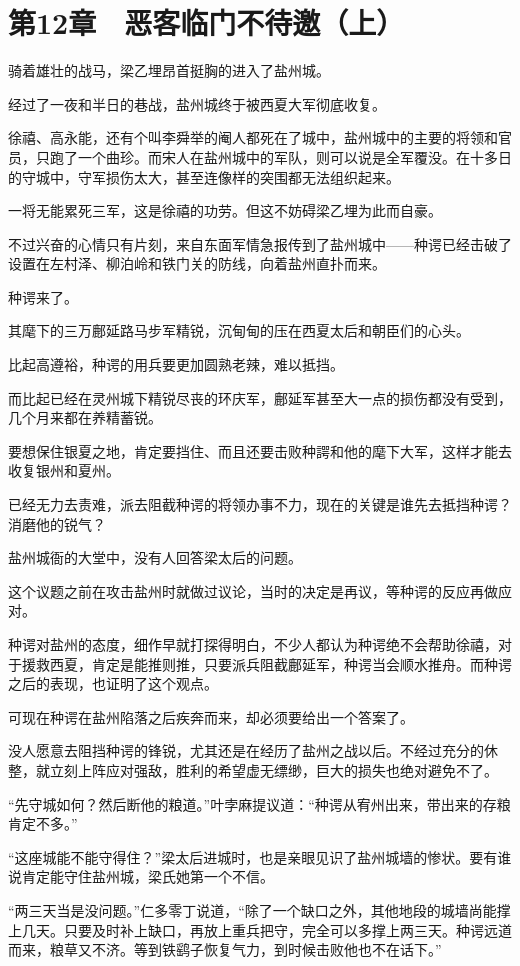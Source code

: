 \section{第12章　恶客临门不待邀（上）}

骑着雄壮的战马，梁乙埋昂首挺胸的进入了盐州城。

经过了一夜和半日的巷战，盐州城终于被西夏大军彻底收复。

徐禧、高永能，还有个叫李舜举的阉人都死在了城中，盐州城中的主要的将领和官员，只跑了一个曲珍。而宋人在盐州城中的军队，则可以说是全军覆没。在十多日的守城中，守军损伤太大，甚至连像样的突围都无法组织起来。

一将无能累死三军，这是徐禧的功劳。但这不妨碍梁乙埋为此而自豪。

不过兴奋的心情只有片刻，来自东面军情急报传到了盐州城中——种谔已经击破了设置在左村泽、柳泊岭和铁门关的防线，向着盐州直扑而来。

种谔来了。

其麾下的三万鄜延路马步军精锐，沉甸甸的压在西夏太后和朝臣们的心头。

比起高遵裕，种谔的用兵要更加圆熟老辣，难以抵挡。

而比起已经在灵州城下精锐尽丧的环庆军，鄜延军甚至大一点的损伤都没有受到，几个月来都在养精蓄锐。

要想保住银夏之地，肯定要挡住、而且还要击败种諤和他的麾下大军，这样才能去收复银州和夏州。

已经无力去责难，派去阻截种谔的将领办事不力，现在的关键是谁先去抵挡种谔？消磨他的锐气？

盐州城衙的大堂中，没有人回答梁太后的问题。

这个议题之前在攻击盐州时就做过议论，当时的决定是再议，等种谔的反应再做应对。

种谔对盐州的态度，细作早就打探得明白，不少人都认为种谔绝不会帮助徐禧，对于援救西夏，肯定是能推则推，只要派兵阻截鄜延军，种谔当会顺水推舟。而种谔之后的表现，也证明了这个观点。

可现在种谔在盐州陷落之后疾奔而来，却必须要给出一个答案了。

没人愿意去阻挡种谔的锋锐，尤其还是在经历了盐州之战以后。不经过充分的休整，就立刻上阵应对强敌，胜利的希望虚无缥缈，巨大的损失也绝对避免不了。

“先守城如何？然后断他的粮道。”叶孛麻提议道：“种谔从宥州出来，带出来的存粮肯定不多。”

“这座城能不能守得住？”梁太后进城时，也是亲眼见识了盐州城墙的惨状。要有谁说肯定能守住盐州城，梁氏她第一个不信。

“两三天当是没问题。”仁多零丁说道，“除了一个缺口之外，其他地段的城墙尚能撑上几天。只要及时补上缺口，再放上重兵把守，完全可以多撑上两三天。种谔远道而来，粮草又不济。等到铁鹞子恢复气力，到时候击败他也不在话下。”

